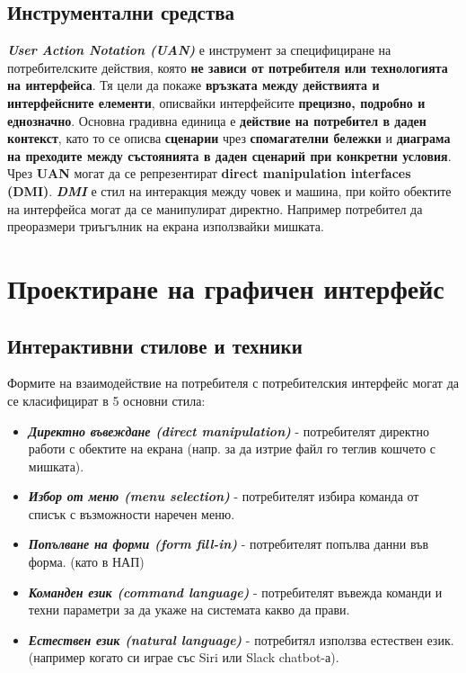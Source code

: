 \documentclass[fleqn,12pt]{article}
\begin{document}
\subsection{Инструментални средства}

\textit{\textbf{User Action Notation (UAN)}} е инструмент за специфициране на потребителските действия, която \textbf{не зависи от потребителя или технологията на интерфейса}.
Тя цели да покаже \textbf{връзката между действията и интерфейсните елементи}, описвайки интерфейсите \textbf{прецизно, подробно и еднозначно}.
\bigbreak
Основна градивна единица е \textbf{действие на потребител в даден контекст}, като то се описва \textbf{сценарии} чрез \textbf{спомагателни бележки} и \textbf{диаграма на преходите между състоянията в даден сценарий при конкретни условия}. 
\bigbreak
Чрез \textbf{UAN} могат да се репрезентират \textbf{direct manipulation interfaces (DMI)}.
\textit{\textbf{DMI}} е стил на интеракция между човек и машина, при който обектите на интерфейса могат да се манипулират директно.
Например потребител да преоразмери триъгълник на екрана използвайки мишката.

\section{Проектиране на графичен интерфейс}

\subsection{Интерактивни стилове и техники}

Формите на взаимодействие на потребителя с потребителския интерфейс могат да се класифицират в 5 основни стила:
\begin{itemize}
    \item \textbf{\textit{Директно въвеждане (direct manipulation)}} - потребителят директно работи с обектите на екрана (напр. за да изтрие файл го теглив кошчето с мишката).
    \item \textbf{\textit{Избор от меню (menu selection)}} - потребителят избира команда от списък с възможности наречен меню.
    \item \textbf{\textit{Попълване на форми (form fill-in)}} - потребителят попълва данни във форма. (като в НАП)
    \item \textbf{\textit{Команден език (command language)}} - потребителят въвежда команди и техни параметри за да укаже на системата какво да прави.
    \item \textbf{\textit{Естествен език (natural language)}} - потребитял използва естествен език. (например когато си играе със Siri или Slack chatbot-а).
\end{itemize}
\end{document}

